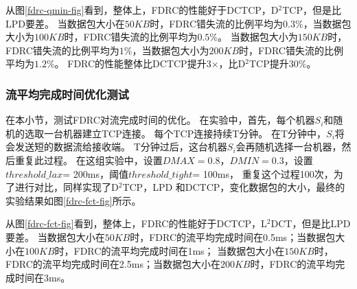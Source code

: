 从图\ref{fdrc-qmin-fig}看到，整体上，FDRC的性能好于DCTCP，D$^2$TCP，但是比LPD要差。
当数据包大小在$50KB$时，FDRC错失流的比例平均为$0.3\%$，当数据包大小为$100KB$时，FDRC错失流的比例平均为$0.5\%$。
当数据包大小为$150KB$时，FDRC错失流的比例平均为$1\%$，当数据包大小为$200KB$时，FDRC错失流的比例平均为$1.2\%$。
FDRC的性能整体比DCTCP提升3$\times$，比D$^2$TCP提升$30\%$。

\subsubsection{流平均完成时间优化测试}
在本小节，测试FDRC对流完成时间的优化。
在实验中，首先，每个机器$S_i$和随机的选取一台机器建立TCP连接。
每个TCP连接持续T分钟。
在T分钟中，$S_i$将会发送短的数据流给接收端。
T分钟过后，这台机器$S_i$会再随机选择一台机器，然后重复此过程。
在这组实验中，设置$DMAX=0.8$，$DMIN=0.3$，设置$threshold\_lax$= 200ms，阈值$threshold\_tight$= 100ms，
重复这个过程100次，为了进行对比，同样实现了D$^2$TCP，LPD
和DCTCP，变化数据包的大小，最终的实验结果如图\ref{fdrc-fct-fig}所示。

从图\ref{fdrc-fct-fig}看到，整体上，FDRC的性能好于DCTCP，L$^2$DCT，但是比LPD要差。
当数据包大小在$50KB$时，FDRC的流平均完成时间在0.5ms；当数据包大小在$100KB$时，FDRC的流平均完成时间在1ms；
当数据包大小在$150KB$时，FDRC的流平均完成时间在2.5ms；当数据包大小在$200KB$时，FDRC的流平均完成时间在3ms。

